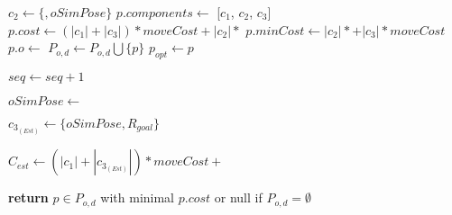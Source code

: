 \begin{algorithm}[H]
\begin{algorithmic}[1]
            \State $c_{2} \gets \{$$, oSimPose\}$
            \State {}
              \State $p.components \gets$ [$c_{1}$, $c_{2}$, $c_{3}$]
              \State $p.cost \gets (|c_{1}| + |c_{3}|) * moveCost + |c_{2}| * $
              \State $p.minCost \gets |c_{2}| * $$ + |c_{3}| * moveCost$
              \State $p.o \gets$  \label{lst:line:ovaraffec1} 
              \State {} 
              \State {}
              \State $P_{o,d} \gets P_{o,d} \bigcup \{p\}$
                \State $p_{opt} \gets p$
              \EndIf \label{lst:line:ovaraffec2}
            \EndIf

          \State $seq \gets seq + 1$ \label{lst:line:loopvarup1}

          \State {}

          \State {}

          \State $oSimPose \gets $ \label{lst:line:loopvarup2}

          \State $c_{3_{(Est)}} \gets \{oSimPose, R_{goal}\}$

          \State $C_{est} \gets (|c_{1}| + |c_{3_{(Est)}}|) * moveCost + $

        \EndWhile

      \EndFor

    \State \textbf{return} $p \in P_{o,d}$ with minimal $p.cost$ or null if $P_{o,d} = \emptyset$

    \EndProcedure

  \end{algorithmic}
\end{algorithm}
